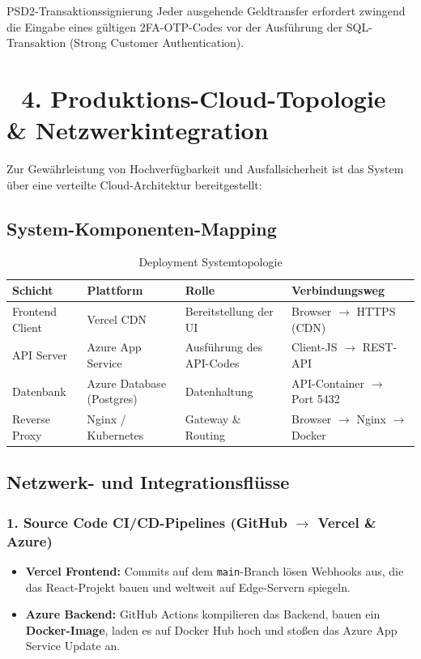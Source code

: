\documentclass[11pt,a4paper]{article}
\begin{document}
\begin{WarningBox}{PSD2-Transaktionssignierung}
Jeder ausgehende Geldtransfer erfordert zwingend die Eingabe eines gültigen 2FA-OTP-Codes vor der Ausführung der SQL-Transaktion (Strong Customer Authentication).
\end{WarningBox}

\newpage

\section{🚢 4. Produktions-Cloud-Topologie \& Netzwerkintegration}
Zur Gewährleistung von Hochverfügbarkeit und Ausfallsicherheit ist das System über eine verteilte Cloud-Architektur bereitgestellt:

\subsection{System-Komponenten-Mapping}
\begin{table}[h]
\centering
\caption{Deployment Systemtopologie}
\begin{tabular}{llll}
\toprule
\textbf{Schicht} & \textbf{Plattform} & \textbf{Rolle} & \textbf{Verbindungsweg} \\
\midrule
\color{SkyBlue}Frontend Client & Vercel CDN & Bereitstellung der UI & Browser $\rightarrow$ HTTPS (CDN) \\
\color{GoldAccent}API Server & Azure App Service & Ausführung des API-Codes & Client-JS $\rightarrow$ REST-API \\
\color{EmeraldGreen}Datenbank & Azure Database (Postgres) & Datenhaltung & API-Container $\rightarrow$ Port 5432 \\
\color{RubyRed}Reverse Proxy & Nginx / Kubernetes & Gateway \& Routing & Browser $\rightarrow$ Nginx $\rightarrow$ Docker \\
\bottomrule
\end{tabular}
\end{table}

\subsection{Netzwerk- und Integrationsflüsse}

\subsubsection{1. Source Code CI/CD-Pipelines (GitHub $\rightarrow$ Vercel \& Azure)}
\begin{itemize}
    \item \textbf{Vercel Frontend:} Commits auf dem \texttt{main}-Branch lösen Webhooks aus, die das React-Projekt bauen und weltweit auf Edge-Servern spiegeln.
    \item \textbf{Azure Backend:} GitHub Actions kompilieren das Backend, bauen ein \textbf{Docker-Image}, laden es auf Docker Hub hoch und stoßen das Azure App Service Update an.
\end{itemize}
\end{document}
